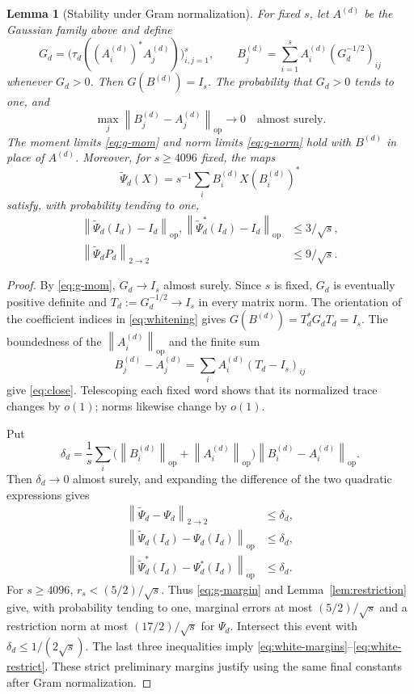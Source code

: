 \documentclass[11pt]{article}
\newtheorem{lemma}[theorem]{Lemma}
\theoremstyle{remark}
\newcommand{\op}{\mathrm{op}}
\newcommand{\hs}{2\to2}
\newcommand{\norm}[1]{\left\lVert#1\right\rVert}
\begin{document}
\begin{lemma}[Stability under Gram normalization]\label{lem:whitening}
For fixed $s$, let $A^{(d)}$ be the Gaussian family above and define
\begin{equation}
 G_d=\bigl(\tau_d((A_i^{(d)})^*A_j^{(d)})\bigr)_{i,j=1}^s,
 \qquad
 B_j^{(d)}=\sum_{i=1}^s A_i^{(d)}(G_d^{-1/2})_{ij}
                                                        \label{eq:whitening}
\end{equation}
whenever $G_d>0$. Then $G(B^{(d)})=I_s$.
The probability that $G_d>0$ tends to one, and
\begin{equation}
 \max_j\norm{B_j^{(d)}-A_j^{(d)}}_{\op}\longrightarrow0
 \quad\text{almost surely}.                              \label{eq:close}
\end{equation}
The moment limits \eqref{eq:g-mom} and norm limits
\eqref{eq:g-norm} hold with $B^{(d)}$ in place of $A^{(d)}$.
Moreover, for $s\geq4096$ fixed, the maps
\[
 \widetilde\Psi_d(X)=s^{-1}\sum_iB_i^{(d)}X(B_i^{(d)})^*
\]
satisfy, with probability tending to one,
\begin{align}
 \norm{\widetilde\Psi_d(I_d)-I_d}_{\op},
 \norm{\widetilde\Psi_d^*(I_d)-I_d}_{\op}
       &\leq3/\sqrt{s}, \label{eq:white-margins}\\
 \norm{\widetilde\Psi_dP_d}_{\hs}
       &\leq9/\sqrt{s}. \label{eq:white-restrict}
\end{align}
\end{lemma}

\begin{proof}
By \eqref{eq:g-mom}, $G_d\to I_s$ almost surely. Since $s$
is fixed, $G_d$ is eventually positive definite and
$T_d:=G_d^{-1/2}\to I_s$ in every matrix norm. The orientation
of the coefficient indices in \eqref{eq:whitening} gives
$G(B^{(d)})=T_d^*G_dT_d=I_s$.
The boundedness of the $\norm{A_i^{(d)}}_{\op}$ and the finite
sum
\[
 B_j^{(d)}-A_j^{(d)}
  =\sum_i A_i^{(d)}(T_d-I_s)_{ij}
\]
give \eqref{eq:close}. Telescoping each fixed word shows
that its normalized trace changes by $o(1)$; norms likewise
change by $o(1)$.

Put
\[
 \delta_d=\frac1s\sum_i
   \bigl(\norm{B_i^{(d)}}_{\op}+\norm{A_i^{(d)}}_{\op}\bigr)
           \norm{B_i^{(d)}-A_i^{(d)}}_{\op}.
\]
Then $\delta_d\to0$ almost surely, and expanding the difference
of the two quadratic expressions gives
\begin{align*}
 \norm{\widetilde\Psi_d-\Psi_d}_{\hs}&\leq\delta_d,\\
 \norm{\widetilde\Psi_d(I_d)-\Psi_d(I_d)}_{\op}&\leq\delta_d,\\
 \norm{\widetilde\Psi_d^*(I_d)-\Psi_d^*(I_d)}_{\op}&\leq\delta_d.
\end{align*}
For $s\geq4096$, $r_s<(5/2)/\sqrt{s}$.
Thus \eqref{eq:g-margin} and Lemma~\ref{lem:restriction}
give, with probability tending to one, marginal errors at most
$(5/2)/\sqrt{s}$ and a restriction norm at most
$(17/2)/\sqrt{s}$ for $\Psi_d$.
Intersect this event with $\delta_d\leq1/(2\sqrt{s})$.
The last three inequalities imply
\eqref{eq:white-margins}--\eqref{eq:white-restrict}.
These strict preliminary margins justify using the same final
constants after Gram normalization.
\end{proof}
\end{document}
